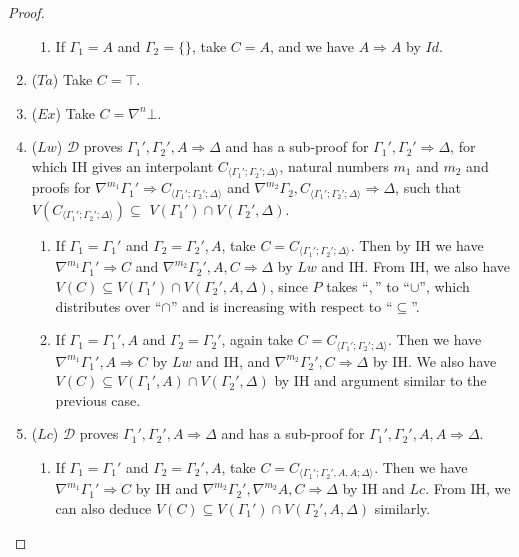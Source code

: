 \documentclass[12pt,a4paper]{article}
\theoremstyle{plain}
\theoremstyle{definition}
\begin{document}
\begin{proof}
\begin{enumerate}
\begin{enumerate}
			\item If $\Gamma_1 = A$ and $\Gamma_2 = \{\}$, take $C = A$, and we have $A \Rightarrow A$ by $Id$.
		\end{enumerate}
		\item ($Ta$) Take $C = \top$.

		\item ($Ex$) Take $C = \nabla^n \bot$.

		\item ($Lw$) $\mathcal{D}$ proves $\Gamma_1' , \Gamma_2' , A \Rightarrow \Delta$ and has a sub-proof for $\Gamma_1' , \Gamma_2' \Rightarrow \Delta$, for which IH gives an interpolant $C_{\langle\Gamma_1';\Gamma_2';\Delta\rangle}$, natural numbers $m_1$ and $m_2$ and proofs for $\nabla^{m_1} \Gamma_1' \Rightarrow C_{\langle\Gamma_1';\Gamma_2';\Delta\rangle}$ and $\nabla^{m_2} \Gamma_2 , C_{\langle\Gamma_1';\Gamma_2';\Delta\rangle} \Rightarrow \Delta$, such that $V(C_{\langle\Gamma_1';\Gamma_2';\Delta\rangle}) \subseteq$ $ V(\Gamma_1') \cap V(\Gamma_2' , \Delta)$.
		\begin{enumerate}
			\item If $\Gamma_1 = \Gamma_1'$ and $\Gamma_2 = \Gamma_2' , A$, take $C = C_{\langle\Gamma_1';\Gamma_2';\Delta\rangle}$. Then by IH we have  $\nabla^{m_1} \Gamma_1' \Rightarrow C$ and $\nabla^{m_2} \Gamma_2' , A , C \Rightarrow \Delta$ by $Lw$ and IH. From IH, we also have $V(C) \subseteq V(\Gamma_1') \cap V(\Gamma_2' , A , \Delta)$, since $P$ takes ``$,$'' to ``$\cup$'', which distributes over ``$\cap$'' and is increasing with respect to ``$\subseteq$''.

			\item If $\Gamma_1 = \Gamma_1' , A$ and $\Gamma_2 = \Gamma_2'$, again take $C = C_{\langle\Gamma_1';\Gamma_2';\Delta\rangle}$. Then we have  $\nabla^{m_1} \Gamma_1' , A \Rightarrow C$ by $Lw$ and IH, and $\nabla^{m_2} \Gamma_2' , C \Rightarrow \Delta$ by IH. We also have $V(C) \subseteq V(\Gamma_1' , A) \cap V(\Gamma_2' , \Delta)$ by IH and argument similar to the previous case.
		\end{enumerate}

		\item ($Lc$) $\mathcal{D}$ proves $\Gamma_1' , \Gamma_2' , A \Rightarrow \Delta$ and has a sub-proof for $\Gamma_1' , \Gamma_2' , A , A \Rightarrow \Delta$.
		\begin{enumerate}
			\item If $\Gamma_1 = \Gamma_1'$ and $\Gamma_2 = \Gamma_2' , A$, take $C = C_{\langle\Gamma_1';\Gamma_2',A,A;\Delta\rangle}$. Then we have $\nabla^{m_1} \Gamma_1' \Rightarrow C$ by IH and $\nabla^{m_2}\Gamma_2' , \nabla^{m_2} A , C \Rightarrow \Delta$ by IH and $Lc$. From IH, we can also deduce $V(C) \subseteq V(\Gamma_1') \cap V(\Gamma_2',A,\Delta)$ similarly.
			

\end{enumerate}
\end{enumerate}
\end{proof}
\end{document}
